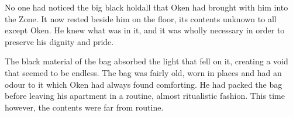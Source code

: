 No one had noticed the big black holdall that Oken had brought with him into the Zone.  It now rested beside him on the floor, its contents unknown to all except Oken.  He knew what was in it, and it was wholly necessary in order to preserve his dignity and pride.  

The black material of the bag absorbed the light that fell on it, creating a void that seemed to be endless.  The bag was fairly old, worn in places and had an odour to it which Oken had always found comforting.  He had packed the bag before leaving his apartment in a routine, almost ritualistic fashion.  This time however, the contents were far from routine.



